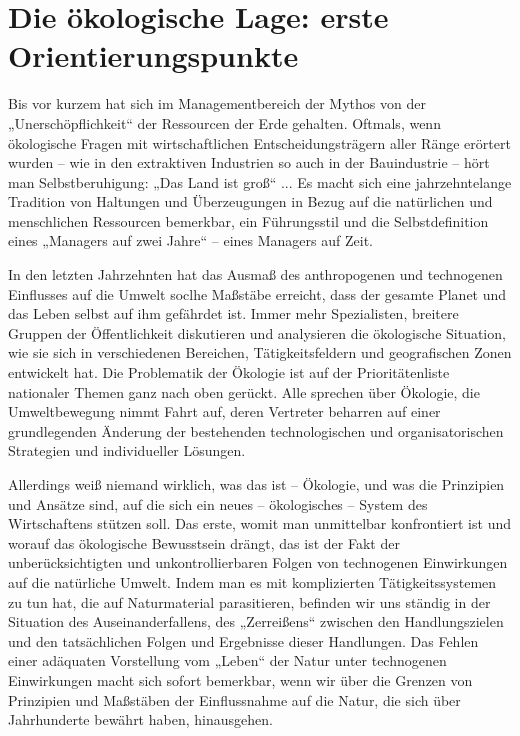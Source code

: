 \documentclass[11pt,a4paper]{article}
\begin{document}
\section{Die ökologische Lage: erste Orientierungspunkte}

Bis vor kurzem hat sich im Managementbereich der Mythos von der
„Unerschöpflichkeit“ der Ressourcen der Erde gehalten. Oftmals, wenn
ökologische Fragen mit wirtschaftlichen Entscheidungsträgern aller Ränge
erörtert wurden -- wie in den extraktiven Industrien so auch in der
Bauindustrie -- hört man Selbstberuhigung: „Das Land ist groß“ ...  Es macht
sich eine jahrzehntelange Tradition von Haltungen und Überzeugungen in Bezug
auf die natürlichen und menschlichen Ressourcen bemerkbar, ein Führungsstil
und die Selbstdefinition eines „Managers auf zwei Jahre“ -- eines Managers auf
Zeit. 

In den letzten Jahrzehnten hat das Ausmaß des anthropogenen und technogenen
Einflusses auf die Umwelt soclhe Maßstäbe erreicht, dass der gesamte Planet
und das Leben selbst auf ihm gefährdet ist. Immer mehr Spezialisten, breitere
Gruppen der Öffentlichkeit diskutieren und analysieren die ökologische
Situation, wie sie sich in verschiedenen Bereichen, Tätigkeitsfeldern und
geografischen Zonen entwickelt hat. Die Problematik der Ökologie ist auf der
Prioritätenliste nationaler Themen ganz nach oben gerückt. Alle sprechen über
Ökologie, die Umweltbewegung nimmt Fahrt auf, deren Vertreter beharren auf
einer grundlegenden Änderung der bestehenden technologischen und
organisatorischen Strategien und individueller Lösungen.

Allerdings weiß niemand wirklich, was das ist -- Ökologie, und was die
Prinzipien und Ansätze sind, auf die sich ein neues -- ökologisches -- System
des Wirtschaftens stützen soll.  Das erste, womit man unmittelbar konfrontiert
ist und worauf das ökologische Bewusstsein drängt, das ist der Fakt der
unberücksichtigten und unkontrollierbaren Folgen von technogenen Einwirkungen
auf die natürliche Umwelt.  Indem man es mit komplizierten Tätigkeitssystemen
zu tun hat, die auf Naturmaterial parasitieren, befinden wir uns ständig in
der Situation des Auseinanderfallens, des „Zerreißens“ zwischen den
Handlungszielen und den tatsächlichen Folgen und Ergebnisse dieser Handlungen.
Das Fehlen einer adäquaten Vorstellung vom „Leben“ der Natur unter technogenen
Einwirkungen macht sich sofort bemerkbar, wenn wir über die Grenzen von
Prinzipien und Maßstäben der Einflussnahme auf die Natur, die sich über
Jahrhunderte bewährt haben, hinausgehen.
\end{document}
